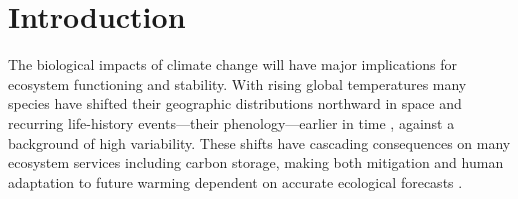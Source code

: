 \documentclass[11pt]{article}
\begin{document}



\section*{Introduction}
The biological impacts of climate change will have major implications for ecosystem functioning and stability. With rising global temperatures many species have shifted their geographic distributions northward in space and recurring life-history events---their phenology---earlier in time \citep{IPCC:2014sm,parmesan2003}, against a background of high variability. These shifts have cascading consequences on many ecosystem services including carbon storage, making both mitigation and human adaptation to future warming dependent on accurate ecological forecasts \citep{richardson2013}. 
\end{document}
